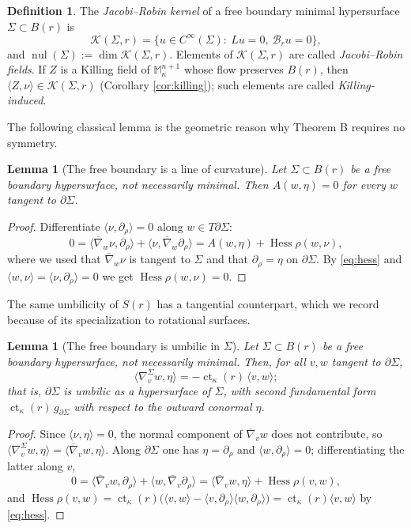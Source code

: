 \documentclass[11pt,a4paper]{amsart}
\theoremstyle{plain}
\newtheorem{lemma}[theorem]{Lemma}
\theoremstyle{definition}
\newtheorem{definition}[theorem]{Definition}
\newcommand{\M}{\mathbb{M}}
\newcommand{\ct}{\operatorname{ct}_\kappa}
\newcommand{\Hess}{\operatorname{Hess}}
\newcommand{\nul}{\operatorname{nul}}
\newcommand{\bconn}{\overline{\nabla}}
\newcommand{\Ker}{\mathcal{K}}
\begin{document}
\begin{definition}\label{def:kernel}
The \emph{Jacobi--Robin kernel} of a free boundary minimal hypersurface $\Sigma\subset B(r)$ is
\[
\Ker(\Sigma,r)=\{u\in C^\infty(\Sigma):\ Lu=0,\ \mathcal{B}_ru=0\},
\]
and $\nul(\Sigma):=\dim\Ker(\Sigma,r)$. Elements of $\Ker(\Sigma,r)$ are called \emph{Jacobi--Robin fields}. If $Z$ is a Killing field of $\M^{n+1}_\kappa$ whose flow preserves $B(r)$, then $\langle Z,\nu\rangle\in\Ker(\Sigma,r)$ (Corollary \ref{cor:killing}); such elements are called \emph{Killing-induced}.
\end{definition}

The following classical lemma is the geometric reason why Theorem B requires no symmetry.

\begin{lemma}[The free boundary is a line of curvature]\label{lem:curvline}
Let $\Sigma\subset B(r)$ be a free boundary hypersurface, not necessarily minimal. Then $A(w,\eta)=0$ for every $w$ tangent to $\partial\Sigma$.
\end{lemma}

\begin{proof}
Differentiate $\langle\nu,\partial_\rho\rangle=0$ along $w\in T\partial\Sigma$:
\[
0=\langle\bconn_w\nu,\partial_\rho\rangle+\langle\nu,\bconn_w\partial_\rho\rangle=A(w,\eta)+\Hess\rho(w,\nu),
\]
where we used that $\bconn_w\nu$ is tangent to $\Sigma$ and that $\partial_\rho=\eta$ on $\partial\Sigma$. By \eqref{eq:hess} and $\langle w,\nu\rangle=\langle\nu,\partial_\rho\rangle=0$ we get $\Hess\rho(w,\nu)=0$.
\end{proof}

The same umbilicity of $S(r)$ has a tangential counterpart, which we record because of its specialization to rotational surfaces.

\begin{lemma}[The free boundary is umbilic in $\Sigma$]\label{lem:bdryumbilic}
Let $\Sigma\subset B(r)$ be a free boundary hypersurface, not necessarily minimal. Then, for all $v,w$ tangent to $\partial\Sigma$,
\begin{equation}\label{eq:bdryumbilic}
\langle\nabla^\Sigma_vw,\eta\rangle=-\ct(r)\,\langle v,w\rangle ;
\end{equation}
that is, $\partial\Sigma$ is umbilic as a hypersurface of $\Sigma$, with second fundamental form $\ct(r)\,g_{\partial\Sigma}$ with respect to the outward conormal $\eta$.
\end{lemma}

\begin{proof}
Since $\langle\nu,\eta\rangle=0$, the normal component of $\bconn_vw$ does not contribute, so $\langle\nabla^\Sigma_vw,\eta\rangle=\langle\bconn_vw,\eta\rangle$. Along $\partial\Sigma$ one has $\eta=\partial_\rho$ and $\langle w,\partial_\rho\rangle=0$; differentiating the latter along $v$,
\[
0=\langle\bconn_vw,\partial_\rho\rangle+\langle w,\bconn_v\partial_\rho\rangle=\langle\bconn_vw,\eta\rangle+\Hess\rho(v,w),
\]
and $\Hess\rho(v,w)=\ct(r)\bigl(\langle v,w\rangle-\langle v,\partial_\rho\rangle\langle w,\partial_\rho\rangle\bigr)=\ct(r)\langle v,w\rangle$ by \eqref{eq:hess}.
\end{proof}
\end{document}
